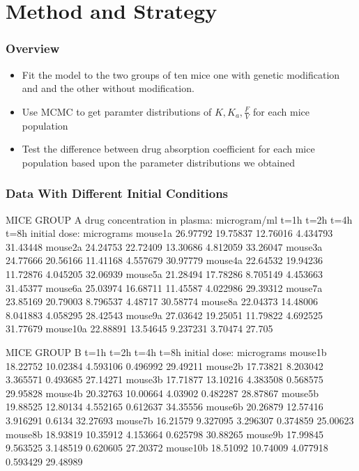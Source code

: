 \documentclass[t]{beamer}
\begin{document}
\section{Method and Strategy}
\begin{frame}[c]
\frametitle{Overview}

\begin{itemize}
\item Fit the model to the two groups of ten mice one with genetic modification and and the other without modification.
\pause
\item Use MCMC to get paramter distributions of  $K, K_{a}, \frac{F}{V}$ for each mice population
\pause
\item Test the difference between drug absorption coefficient for each mice population based upon the parameter distributions we obtained
\end{itemize}
\end{frame}

\begin{frame}[fragile]
  \frametitle{Data With Different Initial Conditions}
\begin{semiverbatim}
{\tiny
MICE GROUP A
drug concentration in plasma: microgram/ml
         t=1h     t=2h     t=4h     t=8h            initial dose: micrograms
mouse1a  26.97792 19.75837 12.76016 4.434793     \alert<2->{   31.43448}
mouse2a  24.24753 22.72409 13.30686 4.812059     \alert<2->{   33.26047}
mouse3a  24.77666 20.56166 11.41168 4.557679     \alert<2->{   30.97779}
mouse4a  22.64532 19.94236 11.72876 4.045205     \alert<2->{   32.06939}
mouse5a  21.28494 17.78286 8.705149 4.453663     \alert<2->{   31.45377}
mouse6a  25.03974 16.68711 11.45587 4.022986     \alert<2->{   29.39312}
mouse7a  23.85169 20.79003 8.796537 4.48717      \alert<2->{   30.58774}
mouse8a  22.04373 14.48006 8.041883 4.058295     \alert<2->{   28.42543}
mouse9a  27.03642 19.25051 11.79822 4.692525     \alert<2->{   31.77679}
mouse10a 22.88891 13.54645 9.237231 3.70474      \alert<2->{   27.705}


MICE GROUP B
        t=1h     t=2h     t=4h     t=8h             initial dose: micrograms  
mouse1b 18.22752 10.02384 4.593106 0.496992      \alert<2->{    29.49211}
mouse2b 17.73821 8.203042 3.365571 0.493685      \alert<2->{    27.14271}
mouse3b 17.71877 13.10216 4.383508 0.568575      \alert<2->{    29.95828}
mouse4b 20.32763 10.00664 4.03902  0.482287      \alert<2->{    28.87867}
mouse5b 19.88525 12.80134 4.552165 0.612637      \alert<2->{    34.35556}
mouse6b 20.26879 12.57416 3.916291 0.6134        \alert<2->{    32.27693}
mouse7b 16.21579 9.327095 3.296307 0.374859      \alert<2->{    25.00623}
mouse8b 18.93819 10.35912 4.153664 0.625798      \alert<2->{    30.88265}
mouse9b 17.99845 9.563525 3.148519 0.620605      \alert<2->{    27.20372}
mouse10b 18.51092 10.74009 4.077918 0.593429     \alert<2->{    29.48989}
}
\end{semiverbatim}
\end{frame}
\end{document}
